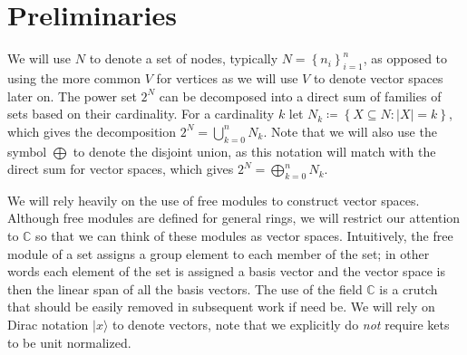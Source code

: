 \documentclass{article}
\newcommand{\ket}[1]{|#1\rangle}
\newcommand{\set}[1]{\left\{ #1 \right\}}
\newcommand{\field}{\mathbb{C}}
\begin{document}




\section{Preliminaries} \label{sec:preliminaries}
We will use $N$ to denote a set of nodes, typically $N = \set{n_i}_{i=1}^n$, as opposed to using the more common $V$ for vertices as we will use $V$ to denote vector spaces later on. The power set $2^N$ can be decomposed into a direct sum of families of sets based on their cardinality. For a cardinality $k$ let  $N_k \coloneqq \set{X \subseteq N : |X| = k}$, which gives the decomposition $2^N = \bigcup_{k=0}^n N_k$. Note that we will also use the symbol $\bigoplus$ to denote the disjoint union, as this notation will match with the direct sum for vector spaces, which gives $2^N = \bigoplus_{k=0}^n N_k$. 

We will rely heavily on the use of free modules to construct vector spaces. Although free modules are defined for general rings, we will restrict our attention to $\field$ so that we can think of these modules as vector spaces. Intuitively, the free module of a set assigns a group element to each member of the set; in other words each element of the set is assigned a basis vector and the vector space is then the linear span of all the basis vectors. The use of the field $\field$ is a crutch that should be easily removed in subsequent work if need be. We will rely on Dirac notation $\ket{x}$ to denote vectors, note that we explicitly do \emph{not} require kets to be unit normalized. 
\end{document}
